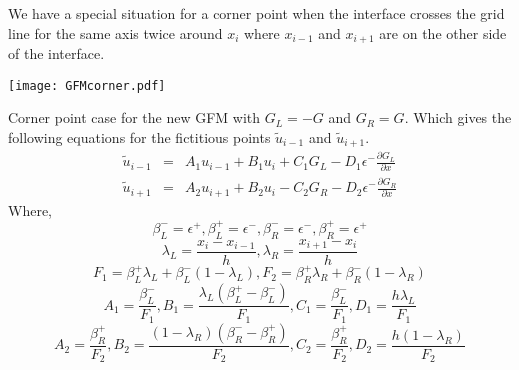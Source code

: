 We have a special situation for a corner point when the interface crosses the grid line for the same axis twice around $x_i$ where $x_{i-1}$ and $x_{i+1}$ are on the other side of the interface.   
		
\begin{center}
	\texttt{[image: GFMcorner.pdf]}\\		
\end{center}
		
Corner point case for the new GFM with $G_L=-G$ and $G_R = G$. 
Which gives the following equations for the fictitious points $\tilde{u}_{i-1}$ and $\tilde{u}_{i+1}$. 
	\begin{eqnarray}
		\tilde{u}_{i-1}&=& A_1 u_{i-1}+B_1 u_{i} + C_1 G_L- D_1 \epsilon^- \frac{\partial G_L}{\partial x} \\
		\tilde{u}_{i+1}&=& A_2 u_{i+1}+B_2 u_{i} - C_2 G_R- D_2 \epsilon^- \frac{\partial G_R}{\partial x}
	\end{eqnarray}
	Where,
	$$\beta_L^-=\epsilon^+,\beta_L^+=\epsilon^-,\beta_R^-=\epsilon^-,\beta_R^+=\epsilon^+$$
	$$\lambda_L=\frac{x_i-x_{i-1}}{h},\lambda_R=\frac{x_{i+1}-x_i}{h}$$
	$$F_1 = \beta^+_L \lambda_L+\beta^-_L(1-\lambda_L), F_2 = \beta^+_R \lambda_R+\beta^-_R(1-\lambda_R)$$
	$$	A_1 = \frac{\beta^-_L}{F_1}, B_1  = \frac{\lambda_L(\beta^+_L-\beta^-_L)}{F_1}, C_1 = \frac{\beta^-_L}{F_1},D_1 = \frac{h \lambda_L}{F_1} $$ %
	$$A_2 = \frac{\beta^+_R}{F_2}, B_2  = \frac{(1-\lambda_R)(\beta^-_R-\beta^+_R)}{F_2}, C_2 = \frac{\beta^+_R}{F_2},D_2 = \frac{h(1- \lambda_R)}{F_2}$$
	
